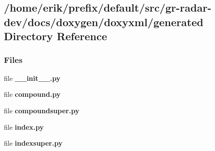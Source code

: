 \subsection{/home/erik/prefix/default/src/gr-\/radar-\/dev/docs/doxygen/doxyxml/generated Directory Reference}
\label{dir_82e1b2f1f0356d1d225f5351b1f83f47}
\subsubsection*{Files}
\begin{DoxyCompactItemize}
\item 
file {\bf \+\_\+\+\_\+init\+\_\+\+\_\+.\+py}
\item 
file {\bf compound.\+py}
\item 
file {\bf compoundsuper.\+py}
\item 
file {\bf index.\+py}
\item 
file {\bf indexsuper.\+py}
\end{DoxyCompactItemize}
